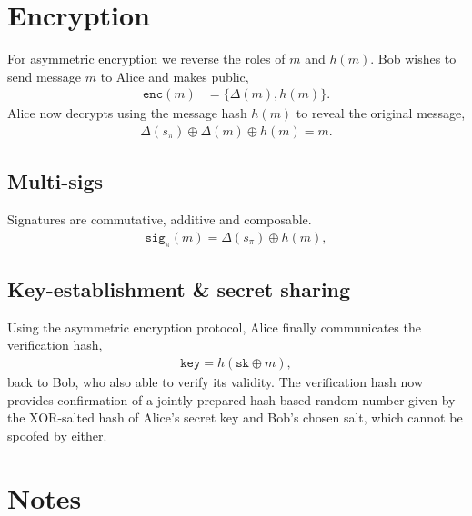 \documentclass[twocolumn, aps, amsmath, amssymb, nofootinbib, superscriptaddress, longbibliography, doublefloatfix, table-of-contents, eqsecnum, rmp]{revtex4-2}
\begin{document}

\section{Encryption}

For asymmetric encryption we reverse the roles of $m$ and $h(m)$. Bob wishes to send message $m$ to Alice and makes public,
\begin{align}
	\mathtt{enc}(m) &= \{\Delta(m), h(m)\}. 
\end{align}
Alice now decrypts using the message hash $h(m)$ to reveal the original message,
\begin{align}
	\Delta(s_\pi) \oplus \Delta(m) \oplus h(m) = m.
\end{align}

\subsection{Multi-sigs}

Signatures are commutative, additive and composable.
\begin{align}
	\mathtt{sig}_\pi(m) = \Delta(s_\pi) \oplus h(m),
\end{align}

\subsection{Key-establishment \& secret sharing}

Using the asymmetric encryption protocol, Alice finally communicates the verification hash,
\begin{align}
	\mathtt{key} = h(\mathtt{sk}\oplus m),
\end{align}
back to Bob, who also able to verify its validity. The verification hash now provides confirmation of a jointly prepared hash-based random number given by  the XOR-salted hash of Alice's secret key and Bob's chosen salt, which cannot be spoofed by either.

\section{Notes}
\end{document}

